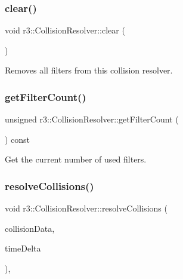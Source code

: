 \subsubsection{\texorpdfstring{clear()}{clear()}}
{\footnotesize\ttfamily void r3\+::\+Collision\+Resolver\+::clear (\begin{DoxyParamCaption}{ }\end{DoxyParamCaption})}

Removes all filters from this collision resolver. \mbox{\label{classr3_1_1_collision_resolver_ae56e2125e24982ad368f0d87e9c2a28f}} 
\subsubsection{\texorpdfstring{get\+Filter\+Count()}{getFilterCount()}}
{\footnotesize\ttfamily unsigned r3\+::\+Collision\+Resolver\+::get\+Filter\+Count (\begin{DoxyParamCaption}{ }\end{DoxyParamCaption}) const}

Get the current number of used filters. \mbox{\label{classr3_1_1_collision_resolver_a134da5221d60b34c568f7de29c9d0a58}} 
\subsubsection{\texorpdfstring{resolve\+Collisions()}{resolveCollisions()}}
{\footnotesize\ttfamily void r3\+::\+Collision\+Resolver\+::resolve\+Collisions (\begin{DoxyParamCaption}\item[{\mbox{\hyperlink{classr3_1_1_collision_data}{Collision\+Data}} \&}]{collision\+Data,  }\item[{\mbox{\hyperlink{namespacer3_ab2016b3e3f743fb735afce242f0dc1eb}{real}}}]{time\+Delta }\end{DoxyParamCaption})\hspace{0.3cm}{\ttfamily [override]}, {\ttfamily [virtual]}}



